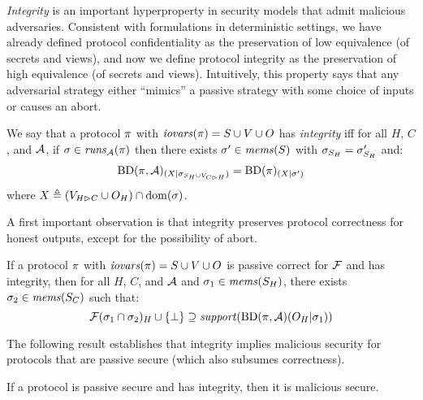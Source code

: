 \emph{Integrity} is an important hyperproperty in security models that admit
malicious adversaries. Consistent with formulations in deterministic settings,
we have already defined protocol confidentiality as the preservation of low equivalence
(of secrets and views), and now we define protocol integrity as the preservation
of high equivalence (of secrets and views). Intuitively, this property says
that any adversarial strategy either ``mimics'' a passive strategy with some
choice of inputs or causes an abort.
\begin{definition}[Integrity]
  \label{def-integrity}
  We say that a protocol $\pi$ with $\mathit{iovars}(\pi) = S \cup V \cup O$ has
  \emph{integrity} iff for all $H$, $C$, and $\mathcal{A}$,
  if $\sigma \in \mathit{runs}_{\mathcal{A}}(\pi)$ 
  then there exists $\sigma' \in \mathit{mems}(S)$ with $\sigma_{S_H} = \sigma'_{S_H} $ and:
    $$
    \mathrm{BD}(\pi,\mathcal{A})_{({X}|{\sigma_{S_H \cup V_{C \rhd H}}})} =
    \mathrm{BD}(\pi)_{({X}|{\sigma'})}
    $$ 
  where $X \triangleq (V_{H \rhd C} \cup O_H) \cap \mathrm{dom}(\sigma)$. 
\end{definition}
A first important observation is that integrity preserves protocol correctness
for honest outputs, except for the possibility of abort. 
\begin{lemma}
  \label{lemma-malicious-correct}
  If a protocol $\pi$ with $\mathit{iovars}(\pi) = S \cup V \cup O$ is passive correct for
  $\mathcal{F}$ and
  has integrity, then for all $H$, $C$, and $\mathcal{A}$ and $\sigma_1 \in \mathit{mems}(S_H)$,
  there exists $\sigma_2 \in \mathit{mems}(S_C)$ such that:
  $$
  \mathcal{F}(\sigma_1 \cap \sigma_2)_H \cup \{ \bot \} \supseteq
    \mathit{support}(\mathrm{BD}(\pi,\mathcal{A})(O_H|\sigma_1))
  $$
\end{lemma}
The following result establishes that integrity implies malicious
security for protocols that are passive secure (which also subsumes
correctness). 
\begin{theorem}
  \label{theorem-integrity}
  If a protocol is passive secure and has integrity, then it
  is malicious secure.
\end{theorem}

